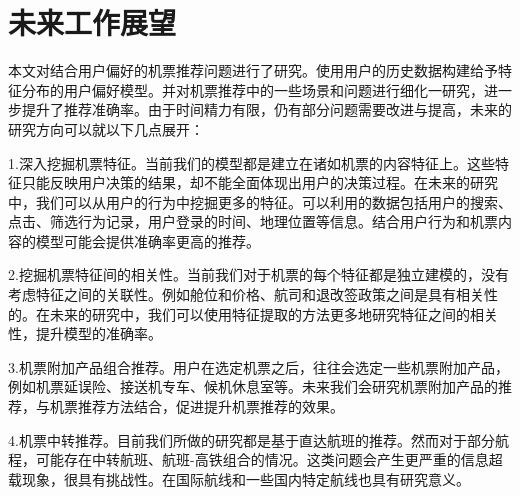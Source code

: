\section{未来工作展望}

本文对结合用户偏好的机票推荐问题进行了研究。使用用户的历史数据构建给予特征分布的用户偏好模型。并对机票推荐中的一些场景和问题进行细化一研究，进一步提升了推荐准确率。由于时间精力有限，仍有部分问题需要改进与提高，未来的研究方向可以就以下几点展开：

1.深入挖掘机票特征。当前我们的模型都是建立在诸如机票的内容特征上。这些特征只能反映用户决策的结果，却不能全面体现出用户的决策过程。在未来的研究中，我们可以从用户的行为中挖掘更多的特征。可以利用的数据包括用户的搜索、点击、筛选行为记录，用户登录的时间、地理位置等信息。结合用户行为和机票内容的模型可能会提供准确率更高的推荐。

2.挖掘机票特征间的相关性。当前我们对于机票的每个特征都是独立建模的，没有考虑特征之间的关联性。例如舱位和价格、航司和退改签政策之间是具有相关性的。在未来的研究中，我们可以使用特征提取的方法更多地研究特征之间的相关性，提升模型的准确率。

3.机票附加产品组合推荐。用户在选定机票之后，往往会选定一些机票附加产品，例如机票延误险、接送机专车、候机休息室等。未来我们会研究机票附加产品的推荐，与机票推荐方法结合，促进提升机票推荐的效果。

4.机票中转推荐。目前我们所做的研究都是基于直达航班的推荐。然而对于部分航程，可能存在中转航班、航班-高铁组合的情况。这类问题会产生更严重的信息超载现象，很具有挑战性。在国际航线和一些国内特定航线也具有研究意义。
